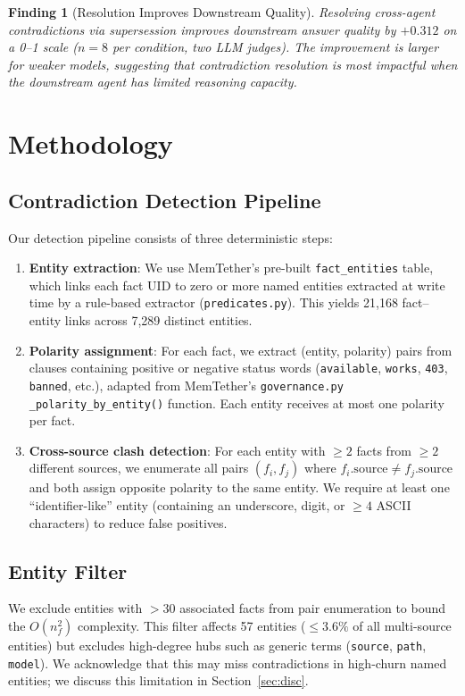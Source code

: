 \documentclass{article}
\newtheorem{finding}{Finding}
\begin{document}
\begin{finding}[Resolution Improves Downstream Quality]
Resolving cross-agent contradictions via supersession improves downstream answer quality by $+0.312$ on a 0--1 scale ($n{=}8$ per condition, two LLM judges). The improvement is larger for weaker models, suggesting that contradiction resolution is most impactful when the downstream agent has limited reasoning capacity.
\end{finding}


\section{Methodology}
\label{sec:methods}

\subsection{Contradiction Detection Pipeline}
Our detection pipeline consists of three deterministic steps:

\begin{enumerate}
\item \textbf{Entity extraction}: We use MemTether's pre-built \texttt{fact\_entities} table, which links each fact UID to zero or more named entities extracted at write time by a rule-based extractor (\texttt{predicates.py}). This yields 21{,}168 fact--entity links across 7{,}289 distinct entities.
\item \textbf{Polarity assignment}: For each fact, we extract (entity, polarity) pairs from clauses containing positive or negative status words (\texttt{available}, \texttt{works}, \texttt{403}, \texttt{banned}, etc.), adapted from MemTether's \texttt{governance.py} \texttt{\_polarity\_by\_entity()} function. Each entity receives at most one polarity per fact.
\item \textbf{Cross-source clash detection}: For each entity with $\geq 2$ facts from $\geq 2$ different sources, we enumerate all pairs $(f_i, f_j)$ where $f_i.\text{source} \neq f_j.\text{source}$ and both assign opposite polarity to the same entity. We require at least one ``identifier-like'' entity (containing an underscore, digit, or $\geq 4$ ASCII characters) to reduce false positives.
\end{enumerate}

\subsection{Entity Filter}
We exclude entities with $>30$ associated facts from pair enumeration to bound the $O(n_f^2)$ complexity. This filter affects 57 entities ($\leq 3.6\%$ of all multi-source entities) but excludes high-degree hubs such as generic terms (\texttt{source}, \texttt{path}, \texttt{model}). We acknowledge that this may miss contradictions in high-churn named entities; we discuss this limitation in Section~\ref{sec:disc}.
\end{document}
